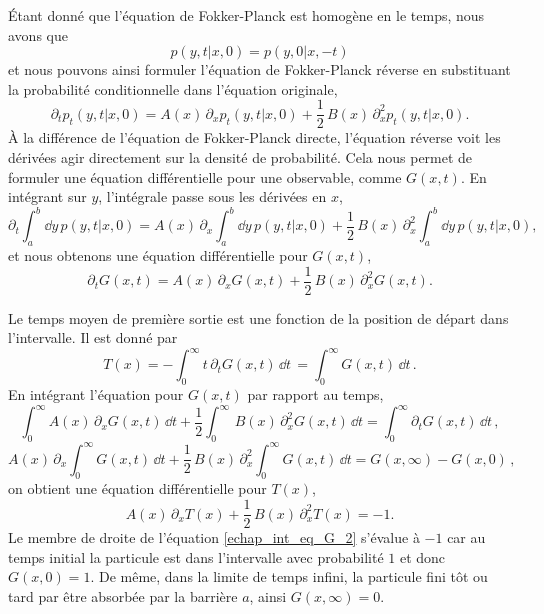 \documentclass[openany,a4paper,12pt]{article}
\begin{document}
\par Étant donné que l'équation de Fokker-Planck est homogène en le temps, nous avons que 
%
\begin{equation}\label{echap_homogeneite_p}
	p(y,t|x,0) = p(y,0|x,-t)
\end{equation}
%
et nous pouvons ainsi formuler l'équation de Fokker-Planck réverse en substituant la probabilité conditionnelle dans l'équation originale,
%
\begin{equation}\label{echap_eq_FP_backward}
	\partial_t p_t(y,t|x,0) = A(x)\, \partial_x p_t(y,t|x,0) + \frac 12 \, B(x)\, \partial_x^2 p_t(y,t|x,0).
\end{equation}
%
À la différence de l'équation de Fokker-Planck directe, l'équation réverse voit les dérivées agir directement sur la densité de probabilité. Cela nous permet de formuler une équation différentielle pour une observable, comme $G(x,t)$. En intégrant sur $y$, l'intégrale passe sous les dérivées en $x$,
%
\begin{equation}\label{echao_int_FP_backward}
	\partial_t \int_a^b \dd y \, p(y,t|x,0) = A(x) \, \partial_x \int_a^b \dd y \, p(y,t|x,0) + \frac 12 \, B(x) \, \partial_x^2 \int_a^b \dd y \, p(y,t|x,0),
\end{equation}
%
et nous obtenons une équation différentielle pour $G(x,t)$,
%
\begin{equation}\label{echap_eq_G}
	\partial_t G(x,t) = A(x) \, \partial_x G(x,t) + \frac 12 \, B(x) \, \partial_x^2 G(x,t).
\end{equation}
%

\par Le temps moyen de première sortie est une fonction de la position de départ dans l'intervalle. Il est donné par
%
\begin{equation}\label{echap_expr_Tx}
	T(x) = - \int_0^\infty t \, \partial_t G(x,t) \, \dd t \, = \int_0^\infty  G(x,t) \, \dd t \, .
\end{equation}
%
En intégrant l'équation pour $G(x,t)$ par rapport au temps,
%
\begin{equation}\label{echap_int_eq_G_1}
	 \int_0^\infty A(x) \, \partial_x G(x,t) \, \dd t + \frac 12 \int_0^\infty \, B(x) \, \partial_x^2 G(x,t) \, \dd t = \int_0^\infty \partial_t G(x,t) \, \dd t \, ,
\end{equation}
%
\begin{equation}\label{echap_int_eq_G_2}
	A(x) \, \partial_x \int_0^\infty G(x,t) \, \dd t + \frac 12 \, B(x) \, \partial_x^2 \int_0^\infty G(x,t) \, \dd t = G(x,\infty) - G(x,0) \, ,
\end{equation}
%
on obtient une équation différentielle pour $T(x)$,
%
\begin{equation}\label{echap_eq_T}
	A(x) \, \partial_x T(x) + \frac 12 \, B(x) \, \partial_x^2 T(x) = -1.
\end{equation}
%
Le membre de droite de l'équation \ref{echap_int_eq_G_2} s'évalue à $-1$ car au temps initial la particule est dans l'intervalle avec probabilité $1$ et donc $G(x,0)=1$. De même, dans la limite de temps infini, la particule fini tôt ou tard par être absorbée par la barrière $a$, ainsi $G(x,\infty)=0$. 
\end{document}
